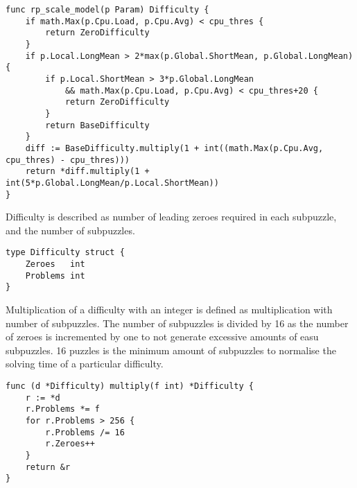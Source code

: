 \begin{verbatim}
func rp_scale_model(p Param) Difficulty {
	if math.Max(p.Cpu.Load, p.Cpu.Avg) < cpu_thres {
		return ZeroDifficulty
	}
	if p.Local.LongMean > 2*max(p.Global.ShortMean, p.Global.LongMean) {
		if p.Local.ShortMean > 3*p.Global.LongMean 
			&& math.Max(p.Cpu.Load, p.Cpu.Avg) < cpu_thres+20 {
			return ZeroDifficulty
		}
		return BaseDifficulty
	}
	diff := BaseDifficulty.multiply(1 + int((math.Max(p.Cpu.Avg, cpu_thres) - cpu_thres)))
	return *diff.multiply(1 + int(5*p.Global.LongMean/p.Local.ShortMean))
}
\end{verbatim}
Difficulty is described as number of leading zeroes required in each subpuzzle, and the number of subpuzzles.
\begin{verbatim}
type Difficulty struct {
	Zeroes   int
	Problems int
}
\end{verbatim}
Multiplication of a difficulty with an integer is defined as multiplication with number of subpuzzles. The number of subpuzzles is divided by 16 as the number of zeroes is incremented by one to not generate excessive amounts of easu subpuzzles. 16 puzzles is the minimum amount of subpuzzles to normalise the solving time of a particular difficulty\cite{subpuzzles}.
\begin{verbatim}
func (d *Difficulty) multiply(f int) *Difficulty {
	r := *d
	r.Problems *= f
	for r.Problems > 256 {
		r.Problems /= 16
		r.Zeroes++
	}
	return &r
}
\end{verbatim}






